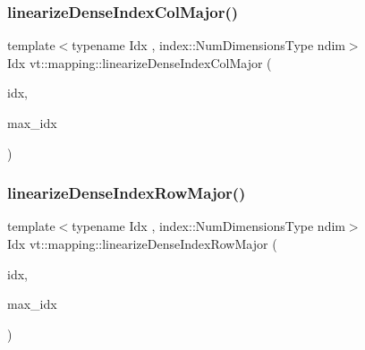 \mbox{\label{namespacevt_1_1mapping_a4dd58859e65edd3145fc52392161c90a}} 
\subsubsection{\texorpdfstring{linearize\+Dense\+Index\+Col\+Major()}{linearizeDenseIndexColMajor()}}
{\footnotesize\ttfamily template$<$typename Idx , index\+::\+Num\+Dimensions\+Type ndim$>$ \\
Idx vt\+::mapping\+::linearize\+Dense\+Index\+Col\+Major (\begin{DoxyParamCaption}\item[{\hyperlink{namespacevt_ac016d9c31465ce11c14eab2be11f9183}{Dense\+Index}$<$ Idx, ndim $>$ $\ast$}]{idx,  }\item[{\hyperlink{namespacevt_ac016d9c31465ce11c14eab2be11f9183}{Dense\+Index}$<$ Idx, ndim $>$ $\ast$}]{max\+\_\+idx }\end{DoxyParamCaption})}

\mbox{\label{namespacevt_1_1mapping_abcd5f8f5e5c974ef83eaa87eeeb416a6}} 
\subsubsection{\texorpdfstring{linearize\+Dense\+Index\+Row\+Major()}{linearizeDenseIndexRowMajor()}}
{\footnotesize\ttfamily template$<$typename Idx , index\+::\+Num\+Dimensions\+Type ndim$>$ \\
Idx vt\+::mapping\+::linearize\+Dense\+Index\+Row\+Major (\begin{DoxyParamCaption}\item[{\hyperlink{namespacevt_ac016d9c31465ce11c14eab2be11f9183}{Dense\+Index}$<$ Idx, ndim $>$ $\ast$}]{idx,  }\item[{\hyperlink{namespacevt_ac016d9c31465ce11c14eab2be11f9183}{Dense\+Index}$<$ Idx, ndim $>$ $\ast$}]{max\+\_\+idx }\end{DoxyParamCaption})}

